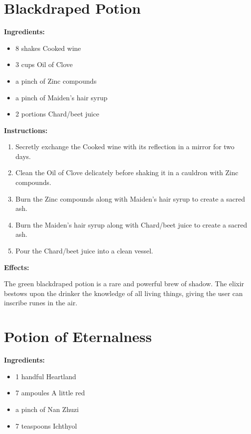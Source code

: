 \documentclass{article}
\begin{document}
\newpage
\section*{Blackdraped Potion}

\textbf{Ingredients:}

\begin{itemize}
  \item 8 shakes Cooked wine
  \item 3 cups Oil of Clove
  \item a pinch of Zinc compounds
  \item a pinch of Maiden's hair syrup
  \item 2 portions Chard/beet juice
\end{itemize}

\textbf{Instructions:}

\begin{enumerate}
  \item Secretly exchange the Cooked wine with its reflection in a mirror for two days.
  \item Clean the Oil of Clove delicately before shaking it in a cauldron with Zinc compounds.
  \item Burn the Zinc compounds along with Maiden's hair syrup to create a sacred ash.
  \item Burn the Maiden's hair syrup along with Chard/beet juice to create a sacred ash.
  \item Pour the Chard/beet juice into a clean vessel.
\end{enumerate}

\textbf{Effects:}

The green blackdraped potion is a rare and powerful brew of shadow. The elixir bestows upon the drinker the knowledge of all living things, giving the user can inscribe runes in the air.

\newpage
\section*{Potion of Eternalness}

\textbf{Ingredients:}

\begin{itemize}
  \item 1 handful Heartland
  \item 7 ampoules A little red
  \item a pinch of Nan Zhuzi
  \item 7 teaspoons Ichthyol
\end{itemize}
\end{document}

